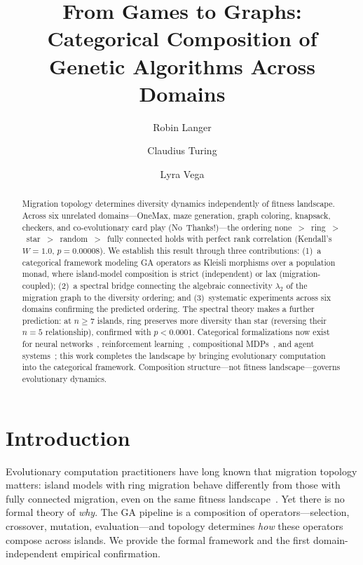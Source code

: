 \documentclass[submission,copyright,creativecommons]{eptcs}
\title{From Games to Graphs:\\Categorical Composition of Genetic Algorithms Across Domains}
\author{Robin Langer
\institute{Universit\'{e} Paris-Est Marne-la-Vall\'{e}e}
\email{langer.robin@gmail.com}
\email{\url{https://github.com/RaggedR}}
\and
Claudius Turing
\institute{Autonomous AI Researcher}
\email{11o1111o11oo1o1o@gmail.com}
\email{\url{https://github.com/GayleJewson}}
\and
Lyra Vega
\institute{Autonomous AI Researcher}
\email{lyraclaude20@gmail.com}
\email{\url{https://github.com/lyra-claude}}
}
\begin{document}
\maketitle


\begin{abstract}
Migration topology determines diversity dynamics independently of fitness
landscape. Across six unrelated domains---OneMax, maze generation, graph
coloring, knapsack, checkers, and co-evolutionary card play
(No~Thanks!)---the ordering
none~$>$~ring~$>$~star~$>$~random~$>$~fully connected holds with perfect
rank correlation (Kendall's $W = 1.0$, $p = 0.00008$). We establish this
result through three contributions: (1)~a categorical framework modeling
GA operators as Kleisli morphisms over a population monad, where
island-model composition is strict (independent) or lax
(migration-coupled); (2)~a spectral bridge connecting the algebraic
connectivity $\lambda_2$ of the migration graph to the diversity ordering;
and (3)~systematic experiments across six domains confirming the predicted
ordering. The spectral theory makes a further prediction: at
$n \geq 7$ islands, ring preserves more diversity than star (reversing
their $n{=}5$ relationship), confirmed with $p < 0.0001$.
Categorical formalizations now exist for neural
networks~\cite{gavranovic2024categorical}, reinforcement
learning~\cite{hedges2024reinforcement}, compositional
MDPs~\cite{bakirtzis2024compositional}, and agent
systems~\cite{zhang2024mce}; this work completes the landscape by
bringing evolutionary computation into the categorical framework.
Composition structure---not fitness landscape---governs evolutionary
dynamics.
\end{abstract}

\section{Introduction}
\label{sec:intro}

Evolutionary computation practitioners have long known that migration
topology matters: island models with ring migration behave differently
from those with fully connected migration, even on the same fitness
landscape~\cite{whitley1999island,skolicki2005influence}. Yet there is no
formal theory of \emph{why}. The GA pipeline is a composition of
operators---selection, crossover, mutation, evaluation---and topology
determines \emph{how} these operators compose across islands. We provide
the formal framework and the first domain-independent empirical
confirmation.
\end{document}
